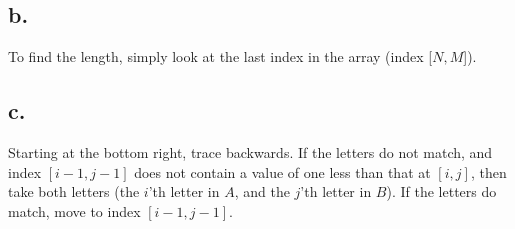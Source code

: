 \documentclass[letterpaper,notitlepage,twoside]{article}
\begin{document}
\subsection*{b.}
To find the length, simply look at the last index in the array (index [$N,M$]).  
\subsection*{c.}
Starting at the bottom right, trace backwards. If the letters do not match, and index $[i-1, j-1]$ does not contain a value of one less than that at $[i, j]$, then take both letters (the $i$'th letter in $A$, and the $j$'th letter in $B$). If the letters do match, move to index $[i-1, j-1]$. 
\end{document}
